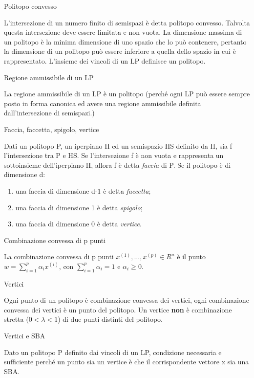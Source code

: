 \documentclass[answers, a4paper, 11pt]{exam}
\begin{document}
\begin{questions}
\begin{solution}
\end{solution}
\question Politopo convesso
\begin{solution}
L'intersezione di un numero finito di semispazi è detta politopo convesso. Talvolta questa intersezione deve essere limitata e non vuota. La dimensione massima di un politopo è la minima dimensione di uno spazio che lo può contenere, pertanto la dimensione di un politopo può essere inferiore a quella dello spazio in cui è rappresentato. L'insieme dei vincoli di un LP definisce un politopo.
\end{solution}
\question Regione ammissibile di un LP
\begin{solution}
La regione ammissibile di un LP è un politopo (perché ogni LP può essere sempre posto in forma canonica ed avere una regione ammissibile definita dall'intersezione di semispazi.)
\end{solution}
\question Faccia, faccetta, spigolo, vertice
\begin{solution}
Dati un politopo P, un iperpiano H ed un semispazio HS definito da H, sia f l'intersezione tra P e HS. Se l'intersezione f è non vuota e rappresenta un sottoinsieme dell'iperpiano H, allora f è detta \emph{faccia} di P.
Se il politopo è di dimensione d:
\begin{enumerate}
\item una faccia di dimensione d-1 è detta \emph{faccetta};
\item una faccia di dimensione 1 è detta \emph{spigolo};
\item una faccia di dimensione 0 è detta \emph{vertice}.
\end{enumerate}
\end{solution}
\question Combinazione convessa di p punti
\begin{solution}
La combinazione convessa di p punti $x^{(1)}, \ldots , x^{(p)} \in R^{n}$ è il punto $w = \sum_{i=1}^p \alpha_{i} x^{(i)}$, con $\sum_{i=1}^p \alpha_{i} = 1$ e $\alpha_{i} \ge 0$.
\end{solution}
\question Vertici 
\begin{solution}
Ogni punto di un politopo è combinazione convessa dei vertici, ogni combinazione convessa dei vertici è un punto del politopo. Un vertice \textbf{non} è combinazione stretta ($0< \lambda <1$) di due punti distinti del politopo.
\end{solution}
\question Vertici e SBA
\begin{solution}
Dato un politopo P definito dai vincoli di un LP, condizione necessaria e sufficiente perché un punto sia un vertice è che il corrispondente vettore x sia una SBA.

\end{solution}
\end{questions}
\end{document}
